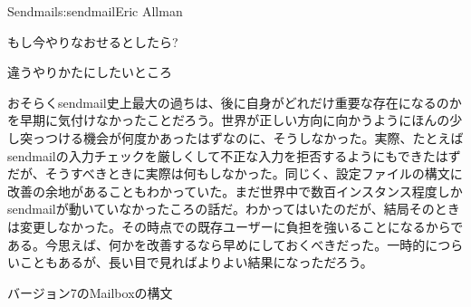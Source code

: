 \begin{aosachapter}{Sendmail}{s:sendmail}{Eric Allman}
\begin{aosasect1}{もし今やりなおせるとしたら?}
\begin{aosasect2}{違うやりかたにしたいところ}

おそらくsendmail史上最大の過ちは、後に自身がどれだけ重要な存在になるのかを早期に気付けなかったことだろう。世界が正しい方向に向かうようにほんの少し突っつける機会が何度かあったはずなのに、そうしなかった。実際、たとえばsendmailの入力チェックを厳しくして不正な入力を拒否するようにもできたはずだが、そうすべきときに実際は何もしなかった。同じく、設定ファイルの構文に改善の余地があることもわかっていた。まだ世界中で数百インスタンス程度しかsendmailが動いていなかったころの話だ。わかってはいたのだが、結局そのときは変更しなかった。その時点での既存ユーザーに負担を強いることになるからである。今思えば、何かを改善するなら早めにしておくべきだった。一時的につらいこともあるが、長い目で見ればよりよい結果になっただろう。

\begin{aosasect3}{バージョン7のMailboxの構文}


\end{aosasect3}
\end{aosasect2}
\end{aosasect1}
\end{aosachapter}
